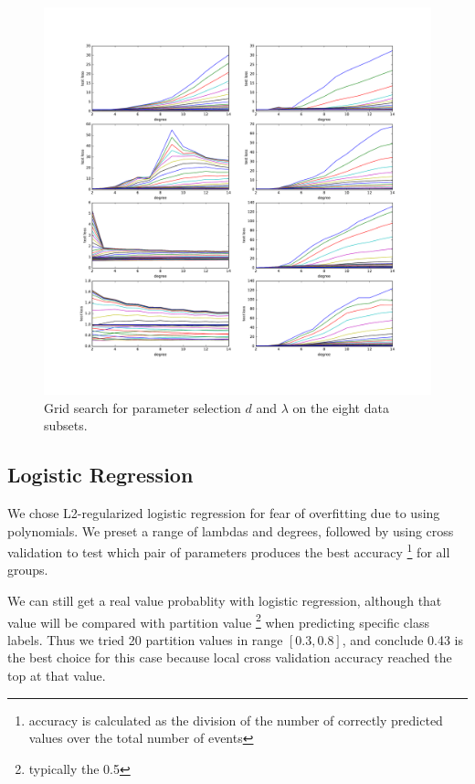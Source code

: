 \documentclass[10pt,conference,compsocconf]{IEEEtran}
\begin{document}
\begin{figure}[tbp] %
  \centering
  \includegraphics[width=\columnwidth]{img/cross_validation_lot.pdf}
  \caption{Grid search for parameter selection $d$ and $\lambda$ on the eight data subsets. }
  \vspace{-3mm}
  \label{param}
\end{figure}

\subsection{Logistic Regression}
We chose L2-regularized logistic regression for fear of overfitting due to using polynomials. We preset a range of lambdas and degrees, followed by using cross validation to test which pair of parameters produces the best accuracy \footnote{accuracy is calculated as the division of the number of correctly predicted values over the total number of events} for all groups. 

We can still get a real value probablity with logistic regression, although that value will be compared with partition value \footnote{typically the 0.5} when predicting specific class labels. Thus we tried 20 partition values in range $[0.3, 0.8]$, and conclude 0.43 is the best choice for this case because local cross validation accuracy reached the top at that value.
\end{document}
